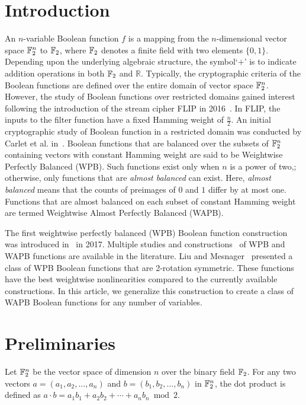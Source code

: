 \documentclass{llncs}
\begin{document}
\section{Introduction}
An $n$-variable Boolean function $f$ is a mapping from the $n$-dimensional vector space $\mathbb{F}_2^n$ to $\mathbb{F}_2$, where $\mathbb{F}_2$ denotes a finite field with two elements $\{0,1\}$. Depending upon the underlying algebraic structure, the symbol`$+$' is to indicate addition operations in both $\mathbb{F}_2$ and $\mathbb{R}$. 
Typically, the cryptographic criteria of the Boolean functions are defined over the entire domain of vector space $\mathbb{F}_2^n$. However, the study of Boolean functions over restricted domains gained interest following the introduction of the stream cipher FLIP in 2016~\cite{EC:MJSC16}.
In FLIP, the inputs to the filter function have a fixed Hamming weight of $\frac{n}{2}$.  
An initial cryptographic study of Boolean function in a restricted domain was conducted by Carlet et al. in~\cite{TOSC:CarMeaRot17}.
Boolean functions that are balanced over the subsets of $\mathbb{F}_2^n$ containing vectors with constant Hamming weight are said to be Weightwise Perfectly Balanced (WPB). 
Such functions exist only when $n$ is a power of two,; otherwise, only functions that are \textit{almost balanced} can exist. Here, \textit{almost balanced} means that the counts of preimages of $0$ and $1$ differ by at most one. Functions that are almost balanced on each subset of constant Hamming weight are termed Weightwise Almost Perfectly Balanced (WAPB).

The first weightwise perfectly balanced (WPB) Boolean function construction was introduced in~\cite{TOSC:CarMeaRot17} in 2017. 
Multiple studies and constructions~\cite{CC:TangLiu19,DCC:LiuMes19,
DAM:LiSu20,CC:MesSu21,DAM:Su21,DAM:ZhuSu22,DAM:GinMea22,CEC:MPJDL22,ACI:ManKuLar22,INDO:GinMea22,CC:MSLZ22,DAM:GuoSu22,C2SI:GinMea23,Latin:GinMea23,DAM:ZLCQZ23,BFA:DM23,AMC:ZhangSu23,Mat:ZJZQ23,ASIACCS:YCL+23,CCDS:GinMea24,AMC:DM24,SAC:Meaux24} of WPB and WAPB functions are available in the literature.
Liu and Mesnager~\cite{DCC:LiuMes19} presented a class of WPB Boolean functions that are 2-rotation symmetric. These functions have the best weightwise nonlinearities compared to the currently available constructions. In this article, we generalize this construction to create a class of WAPB Boolean functions for any number of variables.


\section{Preliminaries}
Let $\mathbb{F}_2^n$ be the vector space of dimension $n$ over the binary field $\mathbb{F}_2$. For any two vectors $a=(a_1, a_2, \ldots, a_n)$ and $b = (b_1, b_2, \ldots, b_n)$ in $\mathbb{F}_2^n$, the dot product is defined as $a\cdot b = a_1 b_1 + a_2 b_2 + \cdots + a_nb_n \bmod 2$.
\end{document}
